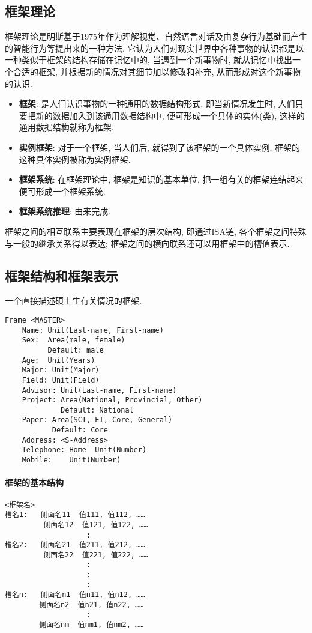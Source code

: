 \subsection{框架理论}
    框架理论是明斯基于1975年作为理解视觉、自然语言对话及由复杂行为基础而产生的智能行为等提出来的一种方法.
它认为人们对现实世界中各种事物的认识都是以一种类似于框架的结构存储在记忆中的, 当遇到一个新事物时, 就从记忆中找出一个合适的框架, 并根据新的情况对其细节加以修改和补充, 从而形成对这个新事物的认识.
\begin{itemize}
    \item \textbf{框架}: 是人们认识事物的一种通用的数据结构形式. 即当新情况发生时, 人们只要把新的数据加入到该通用数据结构中, 便可形成一个具体的实体(类), 这样的通用数据结构就称为框架.
    \item \textbf{实例框架}: 对于一个框架, 当人们后, 就得到了该框架的一个具体实例, 框架的这种具体实例被称为实例框架.
    \item \textbf{框架系统}: 在框架理论中, 框架是知识的基本单位, 把一组有关的框架连结起来便可形成一个框架系统.
    \item \textbf{框架系统推理}: 由来完成.
\end{itemize}
框架之间的相互联系主要表现在框架的层次结构, 即通过ISA链, 各个框架之间特殊与一般的继承关系得以表达;
框架之间的横向联系还可以用框架中的槽值表示.
\subsection{框架结构和框架表示}
\begin{example}
一个直接描述硕士生有关情况的框架.
\end{example}
\begin{Verbatim}
Frame <MASTER>
    Name: Unit(Last-name, First-name)
    Sex:  Area(male, female)
          Default: male
    Age:  Unit(Years)
    Major: Unit(Major)
    Field: Unit(Field)
    Advisor: Unit(Last-name, First-name)
    Project: Area(National, Provincial, Other)
             Default: National
    Paper: Area(SCI, EI, Core, General)
           Default: Core
    Address: <S-Address>
    Telephone: Home  Unit(Number)
    Mobile:    Unit(Number)
\end{Verbatim}

\paragraph{框架的基本结构}
\begin{Verbatim}
<框架名>
槽名1:   侧面名11  值111, 值112, ……
         侧面名12  值121, 值122, ……
                   :
槽名2:   侧面名21  值211, 值212, ……
         侧面名22  值221, 值222, ……
                   :
                   :
                   :
槽名n:   侧面名n1  值n11, 值n12, ……
        侧面名n2  值n21, 值n22, ……
                   :
        侧面名nm  值nm1, 值nm2, ……
\end{Verbatim}

